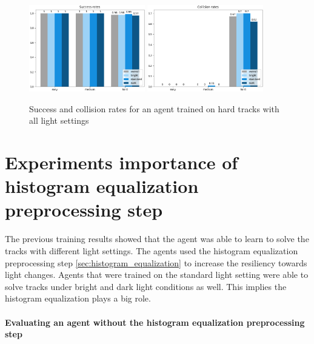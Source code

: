 \begin{figure}
    \centering
    \includegraphics[width=0.45\textwidth]{Bilder/notebook_images/hardDistanceMixedLight_eval_all_success_rates_barplot.png}
    \includegraphics[width=0.45\textwidth]{Bilder/notebook_images/hardDistanceMixedLight_eval_all_collision_rates_barplot.png}
    \caption{Success and collision rates for an agent trained on hard tracks with all light settings}
    \label{fig:hardDistance_mixedLightTraining_results}
\end{figure}



\section{Experiments importance of histogram equalization preprocessing step}

The previous training results showed that the agent was able to learn to solve the tracks with different light settings. The agents used the histogram equalization preprocessing step \ref{sec:histogram_equalization} to increase the resiliency towards light changes. Agents that were trained on the standard light setting were able to solve tracks under bright and dark light conditions as well. This implies the histogram equalization plays a big role.

\paragraph{Evaluating an agent without the histogram equalization preprocessing step}

